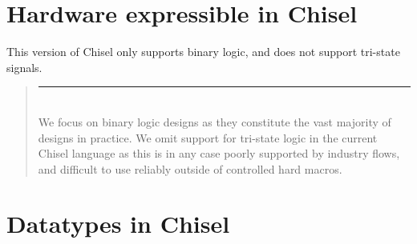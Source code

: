 \documentclass[twocolumn,10pt]{article}
\newenvironment{commentary}
{ \vspace{-0.1in}
  \begin{quotation}
  \noindent
  \small \em
  \rule{\linewidth}{1pt}\\
}
{
  \end{quotation}
}
\begin{document}
\section{Hardware expressible in Chisel}

% 

This version of Chisel only supports binary logic, and does not
support tri-state signals.
\begin{commentary}
We focus on binary logic designs as they constitute the vast majority
of designs in practice.  We omit support for tri-state logic in the
current Chisel language as this is in any case poorly supported by
industry flows, and difficult to use reliably outside of controlled
hard macros.
\end{commentary}

\section{Datatypes in Chisel}
\end{document}
